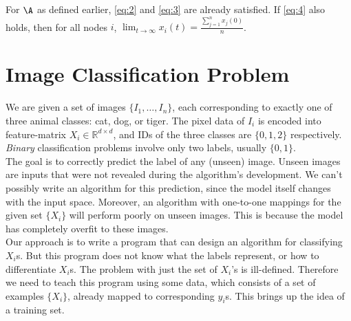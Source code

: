 \documentclass[12pt]{article}
\begin{document}
\noindent For $\A$ as defined earlier, \eqref{eq:2} and \eqref{eq:3} are already satisfied. If \eqref{eq:4} also holds, then for all nodes $i$, $\lim_{t\to \infty} x_i(t) = \frac{\sum_{j=1}^{n} x_j(0)}{n}$.


%
%
%


\section{Image Classification Problem}

We are given a set of images $\{I_1, \dots, I_n\}$, each corresponding to exactly one of three animal classes: cat, dog, or tiger. The pixel data of $I_i$ is encoded into feature-matrix $X_i \in \mathbb{R}^{d\times d}$, and IDs of the three classes are $\{0,1,2\}$ respectively. \textit{Binary} classification problems involve only two labels, usually $\{0,1\}$.
\\

\noindent The goal is to correctly predict the label of any (unseen) image. Unseen images are inputs that were not revealed during the algorithm's development. We can't possibly write an algorithm for this prediction, since the model itself changes with the input space. Moreover, an algorithm with one-to-one mappings for the given set $\{X_i\}$ will perform poorly on unseen images. This is because the model has completely overfit to these images.
\\

\noindent Our approach is to write a program that can design an algorithm for classifying $X_i$s. But this program does not know what the labels represent, or how to differentiate $X_i$s. The problem with just the set of $X_i$'s is ill-defined. Therefore we need to teach this program using some data, which consists of a set of examples $\{X_i\}$, already mapped to corresponding $y_i$s. This brings up the idea of a training set.
\end{document}
